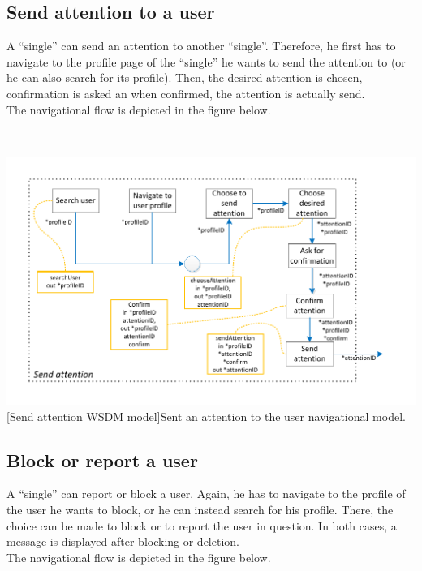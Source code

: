 \documentclass[11pt, a4paper,svglistings,oneside]{book}
\begin{document}
\subsection{Send attention to a user}

A ``single'' can send an attention to another ``single''. Therefore, he first has to navigate to the profile page of the ``single'' he wants to send the attention to (or he can also search for its profile). Then, the desired attention is chosen, confirmation is asked an when confirmed, the attention is actually send. \\
The navigational flow is depicted in the figure below.

$\;$ \\
\noindent\begin{minipage}{\textwidth}
    \centering
   \includegraphics[scale=1.05]{nav_SendAttention.pdf}
 [Send attention WSDM model]{Sent an attention to the user navigational model.}
\end{minipage}

\subsection{Block or report a user}

A ``single'' can report or block a user. Again, he has to navigate to the profile of the user he wants to block, or he can instead search for his profile. There, the choice can be made to block or to report the user in question. In both cases, a message is displayed after blocking or deletion. \\
The navigational flow is depicted in the figure below.
\end{document}
